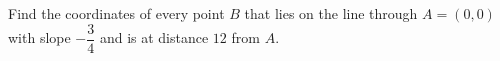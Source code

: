 Find the coordinates of every point $B$ that lies on the line through $A=(0,0)$ with slope $-\dfrac{3}{4}$ and is at distance $12$ from $A$.
